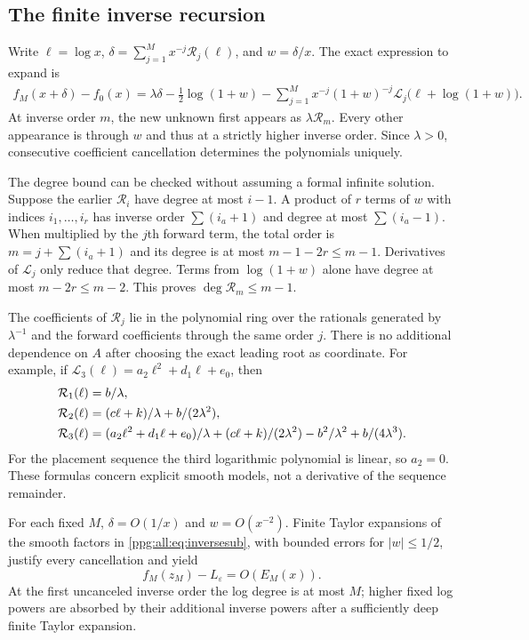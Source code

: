 \documentclass[11pt,letterpaper]{article}
\theoremstyle{remark}\newtheorem{remark}[theorem]{Remark}
\numberwithin{equation}{section}
\begin{document}
\subsection{The finite inverse recursion}
Write $\ell=\log x$, $\delta=\sum_{j=1}^M x^{-j}\mathcal R_j(\ell)$, and $w=\delta/x$. The exact expression to expand is
\begin{align}
 f_M(x+\delta)-f_0(x)
 =\lambda\delta-\tfrac12\log(1+w)
  -\sum_{j=1}^M x^{-j}(1+w)^{-j}
       \mathcal L_j\bigl(\ell+\log(1+w)\bigr).
 \label{ppg:all:eq:inversesub}
\end{align}
At inverse order $m$, the new unknown first appears as $\lambda\mathcal R_m$. Every other appearance is through $w$ and thus at a strictly higher inverse order. Since $\lambda>0$, consecutive coefficient cancellation determines the polynomials uniquely.

The degree bound can be checked without assuming a formal infinite solution. Suppose the earlier $\mathcal R_i$ have degree at most $i-1$. A product of $r$ terms of $w$ with indices $i_1,\ldots,i_r$ has inverse order $\sum(i_a+1)$ and degree at most $\sum(i_a-1)$. When multiplied by the $j$th forward term, the total order is $m=j+\sum(i_a+1)$ and its degree is at most $m-1-2r\le m-1$. Derivatives of $\mathcal L_j$ only reduce that degree. Terms from $\log(1+w)$ alone have degree at most $m-2r\le m-2$. This proves $\deg\mathcal R_m\le m-1$.

The coefficients of $\mathcal R_j$ lie in the polynomial ring over the rationals generated by $\lambda^{-1}$ and the forward coefficients through the same order $j$. There is no additional dependence on $A$ after choosing the exact leading root as coordinate. For example, if
$\mathcal L_3(\ell)=a_2\ell^2+d_1\ell+e_0$, then
\begin{align}
 \mathcal R_1(\ell)&=b/\lambda,\notag\\
 \mathcal R_2(\ell)&=(c\ell+k)/\lambda+b/(2\lambda^2),\label{ppg:all:eq:R123}\\
 \mathcal R_3(\ell)&=(a_2\ell^2+d_1\ell+e_0)/\lambda
 +(c\ell+k)/(2\lambda^2)-b^2/\lambda^2+b/(4\lambda^3).\notag
\end{align}
For the placement sequence the third logarithmic polynomial is linear, so $a_2=0$. These formulas concern explicit smooth models, not a derivative of the sequence remainder.

For each fixed $M$, $\delta=O(1/x)$ and $w=O(x^{-2})$. Finite Taylor expansions of the smooth factors in \eqref{ppg:all:eq:inversesub}, with bounded errors for $|w|\le1/2$, justify every cancellation and yield
\begin{equation}\label{ppg:all:eq:formalresidual}
 f_M(z_M)-L_\varepsilon=O(E_M(x)).
\end{equation}
At the first uncanceled inverse order the log degree is at most $M$; higher fixed log powers are absorbed by their additional inverse powers after a sufficiently deep finite Taylor expansion.
\end{document}
